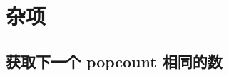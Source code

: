 \section{杂项}

\subsection{获取下一个 popcount 相同的数}

\inputminted{cpp}{icpc/misc/next_hamming/next_hamming.cpp}
